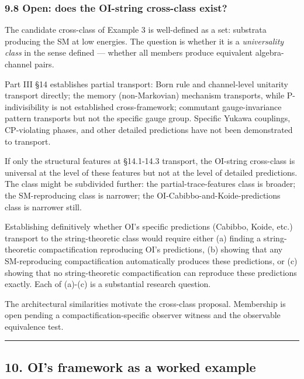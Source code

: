 \documentclass[
]{article}
\begin{document}
\hypertarget{open-does-the-oi-string-cross-class-exist}{%
\subsubsection{9.8 Open: does the OI-string cross-class
exist?}\label{open-does-the-oi-string-cross-class-exist}}

The candidate cross-class of Example 3 is well-defined as a set:
substrata producing the SM at low energies. The question is whether it
is a \emph{universality class} in the sense defined --- whether all
members produce equivalent algebra-channel pairs.

Part III §14 establishes partial transport: Born rule and channel-level
unitarity transport directly; the memory (non-Markovian) mechanism
transports, while P-indivisibility is not established cross-framework;
commutant gauge-invariance pattern transports but not the specific gauge
group. Specific Yukawa couplings, CP-violating phases, and other
detailed predictions have not been demonstrated to transport.

If only the structural features at §14.1-14.3 transport, the OI-string
cross-class is universal at the level of these features but not at the
level of detailed predictions. The class might be subdivided further:
the partial-trace-features class is broader; the SM-reproducing class is
narrower; the OI-Cabibbo-and-Koide-predictions class is narrower still.

Establishing definitively whether OI's specific predictions (Cabibbo,
Koide, etc.) transport to the string-theoretic class would require
either (a) finding a string-theoretic compactification reproducing OI's
predictions, (b) showing that any SM-reproducing compactification
automatically produces these predictions, or (c) showing that no
string-theoretic compactification can reproduce these predictions
exactly. Each of (a)-(c) is a substantial research question.

The architectural similarities motivate the cross-class proposal.
Membership is open pending a compactification-specific observer witness
and the observable equivalence test.

\begin{center}\rule{0.5\linewidth}{0.5pt}\end{center}

\hypertarget{ois-framework-as-a-worked-example}{%
\subsection{10. OI's framework as a worked
example}\label{ois-framework-as-a-worked-example}}
\end{document}
